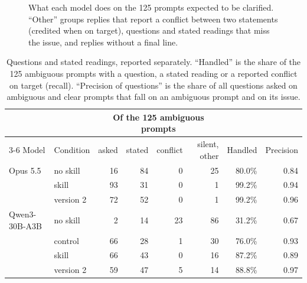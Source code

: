 \documentclass[11pt,a4paper]{article}
\begin{document}
\begin{figure}[t]
\centering
{}
\caption{What each model does on the 125 prompts expected to be clarified.
``Other'' groups replies that report a conflict between two statements
(credited when on target), questions and stated readings that miss the
issue, and replies without a final line.}
\label{fig:outcomes}
\end{figure}

\begin{table}[t]
\centering\small
\begin{tabular}{@{}l l rrrr r r@{}}
\toprule
& & \multicolumn{4}{c}{Of the 125 ambiguous prompts} & & \\
\cmidrule(lr){3-6}
Model & Condition & asked & stated & conflict & silent, other & Handled & Precision \\
\midrule
Opus 5.5 & no skill & 16 & 84 & 0 & 25 & 80.0\% & 0.84 \\
& skill & 93 & 31 & 0 & 1 & 99.2\% & 0.94 \\
& version 2 & 72 & 52 & 0 & 1 & 99.2\% & 0.96 \\
\midrule
Qwen3-30B-A3B & no skill & 2 & 14 & 23 & 86 & 31.2\% & 0.67 \\
& control & 66 & 28 & 1 & 30 & 76.0\% & 0.93 \\
& skill & 66 & 43 & 0 & 16 & 87.2\% & 0.89 \\
& version 2 & 59 & 47 & 5 & 14 & 88.8\% & 0.97 \\
\bottomrule
\end{tabular}
\caption{Questions and stated readings, reported separately. ``Handled''
is the share of the 125 ambiguous prompts with a question, a stated
reading or a reported conflict on target (recall). ``Precision of
questions'' is the share of all questions asked on ambiguous and clear
prompts that fall on an ambiguous prompt and on its issue.}
\label{tab:acts}
\end{table}
\end{document}
